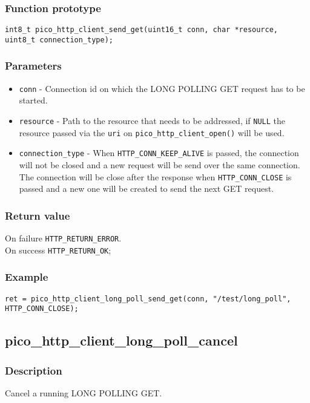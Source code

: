 \subsubsection*{Function prototype}
\texttt{int8\_t pico\_http\_client\_send\_get(uint16\_t conn, char *resource, uint8\_t connection\_type);}

\subsubsection*{Parameters}

\begin{itemize}[noitemsep]
\item \texttt{conn} - Connection id on which the LONG POLLING GET request has to be started.
\item \texttt{resource} - Path to the resource that needs to be addressed, if \texttt{NULL} the resource passed via the \texttt{uri} on \texttt{pico\_http\_client\_open()} will be used.
\item \texttt{connection\_type} - When \texttt{HTTP\_CONN\_KEEP\_ALIVE} is passed, the connection will not be closed and a new request will be send over the same connection. The connection will be close after the response when \texttt{HTTP\_CONN\_CLOSE} is passed and a new one will be created to send the next GET request.
\end{itemize}
\subsubsection*{Return value}
On failure \texttt{HTTP\_RETURN\_ERROR}.
\\On success \texttt{HTTP\_RETURN\_OK};
\subsubsection*{Example}
\begin{verbatim}
ret = pico_http_client_long_poll_send_get(conn, "/test/long_poll", HTTP_CONN_CLOSE);
\end{verbatim}


\subsection{pico\_http\_client\_long\_poll\_cancel}

\subsubsection*{Description}
Cancel a running LONG POLLING GET.

